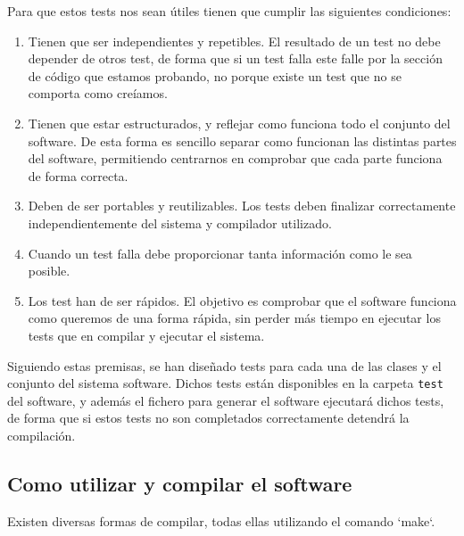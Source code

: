Para que estos tests nos sean útiles tienen que cumplir las siguientes condiciones:

\begin{enumerate}
	\item Tienen que ser independientes y repetibles. El resultado de un test no debe depender de otros test, de forma que si un test falla este falle por la sección de código que estamos probando, no porque existe un test que no se comporta como creíamos.
	\item Tienen que estar estructurados, y reflejar como funciona todo el conjunto del software. De esta forma es sencillo separar como funcionan las distintas partes del software, permitiendo centrarnos en comprobar que cada parte funciona de forma correcta.
	\item Deben de ser portables y reutilizables. Los tests deben finalizar correctamente independientemente del sistema y compilador utilizado.
	\item Cuando un test falla debe proporcionar tanta información como le sea posible.
	\item Los test han de ser rápidos. El objetivo es comprobar que el software funciona como queremos de una forma rápida, sin perder más tiempo en ejecutar los tests que en compilar y ejecutar el sistema.
\end{enumerate}

Siguiendo estas premisas, se han diseñado tests para cada una de las clases y el conjunto del sistema software. Dichos tests están disponibles en la carpeta \texttt{test} del software, y además el fichero para generar el software ejecutará dichos tests, de forma que si estos tests no son completados correctamente detendrá la compilación.

\newpage

\subsection{Como utilizar y compilar el software}

Existen diversas formas de compilar, todas ellas utilizando el comando `make`.

